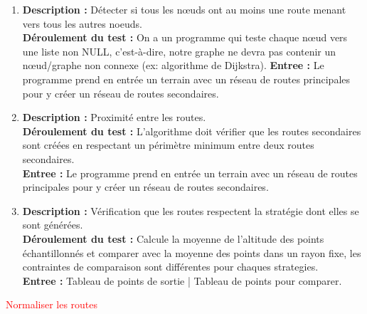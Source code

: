 { 
    \begin{enumerate}
    \item \textbf{Description : } Détecter si tous les nœuds ont au moins une route menant vers tous les autres noeuds.\\
    \textbf{Déroulement du test : } On a un programme qui teste chaque nœud vers une liste non NULL, c’est-à-dire, notre graphe ne devra pas contenir un nœud/graphe non connexe (ex: algorithme de Dijkstra). 
    \textbf{Entree : } Le programme prend en entrée un terrain avec un réseau de routes principales pour y créer un réseau de routes secondaires. \\

    \item \textbf{Description : }  Proximité entre les routes.\\
    \textbf{Déroulement du test : } L’algorithme doit vérifier que les routes secondaires sont créées en respectant un périmètre minimum entre deux routes secondaires.\\
    \textbf{Entree : } Le programme prend en entrée un terrain avec un réseau de routes principales pour y créer un réseau de routes secondaires. \\

    \item \textbf{Description : } Vérification que les routes respectent la stratégie dont elles se sont générées.\\
    \textbf{Déroulement du test : } Calcule la moyenne de l’altitude des points échantillonnés et comparer avec la moyenne des points dans un rayon fixe, les contraintes de comparaison sont différentes pour chaques strategies.\\
    \textbf{Entree : } Tableau de points de sortie | Tableau de points pour comparer.\\


  \end{enumerate}
}
\besoin{}
{\textcolor{red}{Normaliser les routes}}
